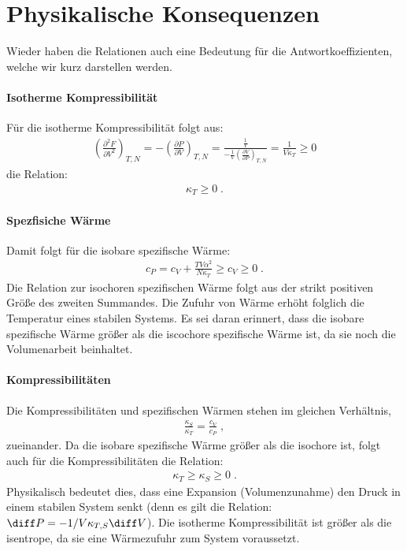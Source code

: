 \section{Physikalische Konsequenzen}
Wieder haben die Relationen auch eine Bedeutung für die Antwortkoeffizienten, welche wir kurz darstellen werden. 
\paragraph*{Isotherme Kompressibilität}
Für die isotherme Kompressibilität folgt aus:
\begin{align*}
	\left(\frac{\partial^2F}{\partial V^2}\right)_{T,N}=-\left(\frac{\partial P}{\partial V}\right)_{T,N}=\frac{\frac{1}{V}}{-\frac{1}{V}\left(\frac{\partial V}{\partial P}\right)_{T,N}}=\frac{1}{V\kappa_T}\geq 0
\end{align*}
die Relation: 
\begin{align*}
	\boxed{\kappa_T\geq 0}\;.
\end{align*}
\paragraph*{Spezfisiche Wärme} Damit folgt für die isobare spezifische Wärme:
\begin{align*}
	\boxed{c_P=c_V+\frac{TV\alpha^2}{N\kappa_T}\geq c_V\geq 0}\;.
\end{align*}
Die Relation zur isochoren spezifischen Wärme folgt aus der strikt positiven Größe des zweiten Summandes.
Die Zufuhr von Wärme erhöht folglich die Temperatur eines stabilen Systems. 
Es sei daran erinnert, dass die isobare spezifische Wärme größer als die iscochore spezifische Wärme ist, da sie noch die Volumenarbeit beinhaltet.
\paragraph*{Kompressibilitäten} Die Kompressibilitäten und spezifischen Wärmen stehen im gleichen Verhältnis,
\begin{align*}
	\boxed{\frac{\kappa_S}{\kappa_T}=\frac{c_V}{c_P}}\;,
\end{align*}
zueinander. Da die isobare spezifische Wärme größer als die isochore ist, folgt auch für die Kompressibilitäten die Relation: 
\begin{align*}
	\boxed{\kappa_T\geq \kappa_S\geq 0}\;.
\end{align*}
Physikalisch bedeutet dies, dass eine Expansion (Volumenzunahme) den Druck in einem stabilen System senkt (denn es gilt die Relation: $\diff P=-1/V\kappa_{T,S}\diff V$). Die isotherme Kompressibilität ist größer als die isentrope, da sie eine Wärmezufuhr zum System voraussetzt.


